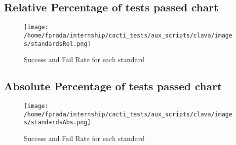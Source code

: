 \documentclass{article}
\begin{document}
\subsection{Relative Percentage of tests passed chart}
\begin{figure}[h!]
\centering
\texttt{[image: /home/fprada/internship/cacti\_tests/aux\_scripts/clava/images/standardsRel.png]}
\caption{Success and Fail Rate for each standard}
\label{fig:standards}
\end{figure}
\subsection{Absolute Percentage of tests passed chart}
\begin{figure}[h!]
\centering
\texttt{[image: /home/fprada/internship/cacti\_tests/aux\_scripts/clava/images/standardsAbs.png]}
\caption{Success and Fail Rate for each standard}
\label{fig:standards}
\end{figure}
\end{document}
